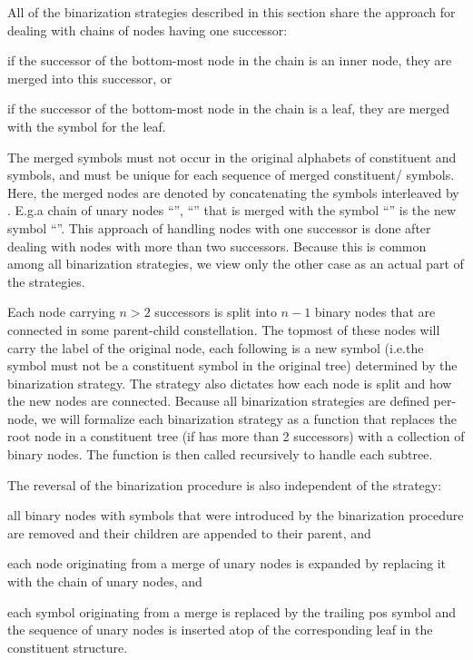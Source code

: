 \documentclass[../../document.tex]{subfiles}
\begin{document}
    All of the binarization strategies described in this section share the approach for dealing with chains of nodes having one successor:
    \begin{inparaenum}
        \item if the successor of the bottom-most node in the chain is an inner node, they are merged into this successor, or
        \item if the successor of the bottom-most node in the chain is a leaf, they are merged with the  symbol for the leaf.
    \end{inparaenum}
    The merged symbols must not occur in the original alphabets of constituent and  symbols, and must be unique for each sequence of merged constituent/ symbols.
    Here, the merged nodes are denoted by concatenating the symbols interleaved by \cn{+}.
    E.g.\@ a chain of unary nodes ``'', ``'' that is merged with the  symbol ``'' is the new symbol ``''.
    This approach of handling nodes with one successor is done after dealing with nodes with more than two successors.
    Because this is common among all binarization strategies, we view only the other case as an actual part of the strategies.

    Each node carrying \( n > 2 \) successors is split into \( n-1 \) binary nodes that are connected in some parent-child constellation.
    The topmost of these nodes will carry the label of the original node, each following is a new symbol (i.e.\@ the symbol must not be a constituent symbol in the original tree) determined by the binarization strategy.
    The strategy also dictates how each node is split and how the new nodes are connected.
    Because all binarization strategies are defined per-node, we will formalize each binarization strategy as a function that replaces the root node in a constituent tree (if has more than 2 successors) with a collection of binary nodes.
    The function is then called recursively to handle each subtree.

    The reversal of the binarization procedure is also independent of the strategy:
    \begin{compactenum}
        \item all binary nodes with symbols that were introduced by the binarization procedure are removed and their children are appended to their parent, and
        \item each node originating from a merge of unary nodes is expanded by replacing it with the chain of unary nodes, and
        \item each  symbol originating from a merge is replaced by the trailing pos symbol and the sequence of unary nodes is inserted atop of the corresponding leaf in the constituent structure.
    \end{compactenum}
\end{document}
